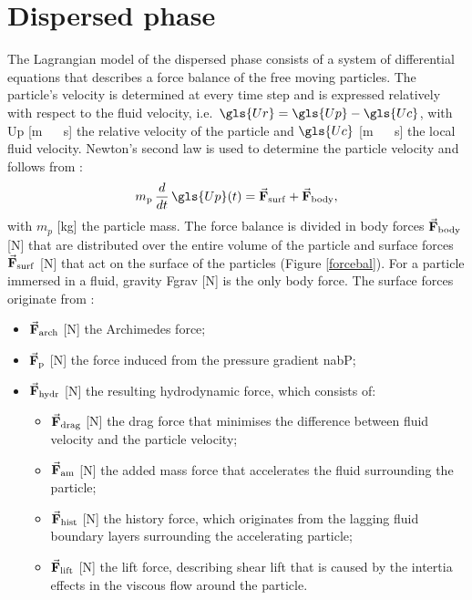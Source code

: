 \section{Dispersed phase \label{sec:dispPhase}}
The Lagrangian model of the dispersed phase consists of a system of differential equations that describes a force balance of the free moving particles. The particle's velocity is determined at every time step and is expressed relatively with respect to the fluid velocity, i.e.\ $\gls{Ur}=\gls{Up} - \gls{Uc}$, with \gls{Up} [\unit{\metre\,\reciprocal\second}] the relative velocity of the particle and $\gls{Uc}$ [\unit{\metre\,\reciprocal\second}] the local fluid velocity. Newton's second law is used to determine the particle velocity and follows from \citep{Worner2003,Ghijs2014}:
\begin{equation}
 m_\mathrm{p} \, \frac{d}{dt} \, \gls{Up}(t)= \vecb{F}_\mathrm{surf} + \vecb{F}_\mathrm{body},
 \label{newton2}
\end{equation}
with $m_p$ [\unit{\kilogram}] the particle mass. The force balance is divided in body forces $\vec{\mathbf{F}}_\mathrm{body}$  [\unit{\newton}] that are distributed over the entire volume of the particle and surface forces $\vec{\mathbf{F}}_\mathrm{surf}$ [\unit{\newton}] that act on the surface of the particles (Figure \ref{forcebal}). For a particle immersed in a fluid, gravity \gls{Fgrav} [\unit{\newton}] is the only body force. The surface forces originate from \citep{Worner2003,Ghijs2014}:

\begin{itemize}
 \item $\vec{\mathbf{F}}_\mathrm{arch}$ [\unit{\newton}] the Archimedes force;
 \item $\vec{\mathbf{F}}_\mathrm{p}$ [\unit{\newton}] the force induced from the pressure gradient \gls{nabP};
 \item $\vec{\mathbf{F}}_\mathrm{hydr}$ [\unit{\newton}] the resulting hydrodynamic force, which consists of:
 \begin{itemize}
  \item $\vec{\mathbf{F}}_\mathrm{drag}$ [\unit{\newton}] the drag force that minimises the difference between fluid velocity and the particle velocity;
 \item $\vec{\mathbf{F}}_\mathrm{am}$ [\unit{\newton}] the added mass force that accelerates the fluid surrounding the particle;
 \item $\vec{\mathbf{F}}_\mathrm{hist}$ [\unit{\newton}] the history force, which originates from the lagging fluid boundary layers surrounding the accelerating particle;
 \item $\vec{\mathbf{F}}_\mathrm{lift}$ [\unit{\newton}] the lift force, describing shear lift that is caused by the intertia effects in the viscous flow around the particle.
  \end{itemize}
 \end{itemize}

